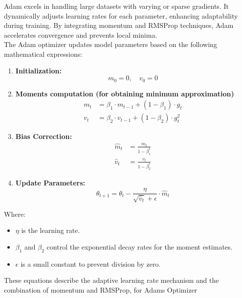 Adam excels in handling large datasets with varying or sparse gradients. It dynamically adjusts learning rates for each parameter, enhancing adaptability during training. By integrating momentum and RMSProp techniques, Adam accelerates convergence and prevents local minima.\\

The Adam optimizer updates model parameters based on the following mathematical expressions:

\begin{enumerate}
    \item \textbf{Initialization:}
          \begin{equation}
              m_0 = 0, \quad v_0 = 0
          \end{equation}

    \item \textbf{Moments computation (for obtaining minimum approximation)}
          \begin{align}
              m_t & = \beta_1 \cdot m_{t-1} + (1 - \beta_1) \cdot g_t   \\
              v_t & = \beta_2 \cdot v_{t-1} + (1 - \beta_2) \cdot g_t^2
          \end{align}

    \item \textbf{Bias Correction:}
          \begin{align}
              \hat{m}_t & = \frac{m_t}{1 - \beta_1^t} \\
              \hat{v}_t & = \frac{v_t}{1 - \beta_2^t}
          \end{align}

    \item \textbf{Update Parameters:}
          \begin{equation}
              \theta_{t+1} = \theta_t - \frac{\eta}{\sqrt{\hat{v}_t} + \epsilon} \cdot \hat{m}_t
          \end{equation}
\end{enumerate}

Where:
\begin{itemize}
    \item \( \eta \) is the learning rate.
    \item \( \beta_1 \) and \( \beta_2 \) control the exponential decay rates for the moment estimates.
    \item \( \epsilon \) is a small constant to prevent division by zero.
\end{itemize}

These equations describe the adaptive learning rate mechanism and the combination of momentum and RMSProp, for Adams Optimizer





